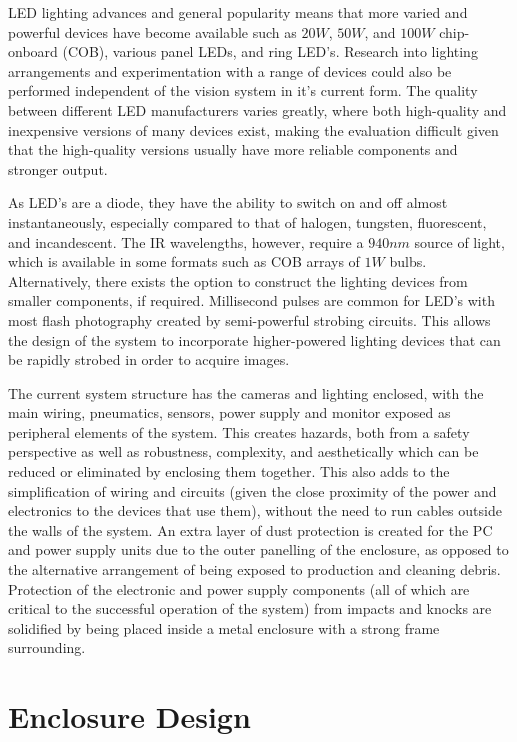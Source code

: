 \documentclass[fleqn,twoside,12pt]{report}
\begin{document}
LED lighting advances and general popularity means that more varied and powerful devices have become available such as $20W$, $50W$, and $100W$ chip-onboard (COB), various panel LEDs, and ring LED's. Research into lighting arrangements and experimentation with a range of devices could also be performed independent of the vision system in it's current form. The quality between different LED manufacturers varies greatly, where both high-quality and inexpensive versions of many devices exist, making the evaluation difficult given that the high-quality versions usually have more reliable components and stronger output. 

As LED's are a diode, they have the ability to switch on and off almost instantaneously, especially compared to that of halogen, tungsten, fluorescent, and incandescent. The IR wavelengths, however, require a $940nm$ source of light, which is available in some formats such as COB arrays of $1W$ bulbs. Alternatively, there exists the option to construct the lighting devices from smaller components, if required. Millisecond pulses are common for LED's with most flash photography created by semi-powerful strobing circuits. This allows the design of the system to incorporate higher-powered lighting devices that can be rapidly strobed in order to acquire images.

The current system structure has the cameras and lighting enclosed, with the main wiring, pneumatics, sensors, power supply and monitor exposed as peripheral elements of the system. This creates hazards, both from a safety perspective as well as robustness, complexity, and aesthetically which can be reduced or eliminated by enclosing them together. This also adds to the simplification of wiring and circuits (given the close proximity of the power and electronics to the devices that use them), without the need to run cables outside the walls of the system. An extra layer of dust protection is created for the PC and power supply units due to the outer panelling of the enclosure, as opposed to the alternative arrangement of being exposed to production and cleaning debris. Protection of the electronic and power supply components (all of which are critical to the successful operation of the system) from impacts and knocks are solidified by being placed inside a metal enclosure with a strong frame surrounding.


\section{Enclosure Design}
\end{document}
